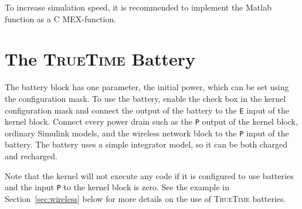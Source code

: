 \documentclass[final,twoside]{rapport}
\begin{document}
To increase simulation speed, it is recommended to implement the
Matlab function as a C MEX-function.

\section{The \textsc{TrueTime} Battery}
\label{sec:battery}

The battery block has one parameter, the initial power, which can be
set using the configuration mask. To use the battery, enable the check
box in the kernel configuration mask and connect the output of the
battery to the {\tt E} input of the kernel block. Connect every power
drain such as the {\tt P} output of the kernel block, ordinary
Simulink models, and the wireless network block to the {\tt P} input
of the battery. The battery uses a simple integrator model, so it can
be both charged and recharged.

Note that the kernel will not execute any code if it is configured to
use batteries and the input {\tt P} to the kernel block is zero. See
the example in Section~\ref{sec:wireless} below for more details on
the use of \textsc{TrueTime} batteries.
\end{document}
